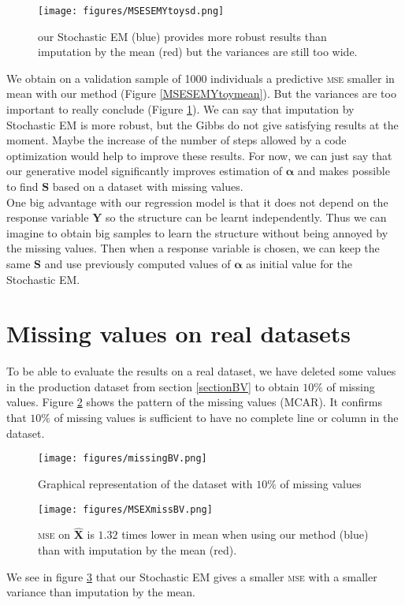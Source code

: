 \documentclass[12pt,a4paper]{report}
\begin{document}
			\begin{figure}[h!]
	\centering
	\texttt{[image: figures/MSESEMYtoysd.png]} 
	\caption{our Stochastic EM (blue) provides more robust results than imputation by the mean (red) but the variances are still too wide.}\label{MSESEMYtoysd}
\end{figure}		
We obtain on a validation sample of 1000 individuals a predictive \textsc{mse} smaller in mean with our method (Figure \ref{MSESEMYtoymean}). But the variances are too important to really conclude (Figure \ref{MSESEMYtoysd}). We can say that imputation by Stochastic EM is more robust, but the Gibbs do not give satisfying results at the moment. Maybe the increase of the number of steps allowed by a code optimization would help to improve these results. For now, we can just say that our generative model significantly improves estimation of $\boldsymbol{\alpha}$ and makes possible to find $\boldsymbol{S}$ based on a dataset with missing values.\\

		One big advantage with our regression model is that it does not depend on the response variable $\boldsymbol{Y}$ so the structure can be learnt independently. Thus we can imagine to obtain big samples to learn the structure without being annoyed by the missing values. Then when a response variable is chosen, we can keep the same $\boldsymbol{S}$ and use previously computed values of $\boldsymbol{\alpha}$ as initial value for the Stochastic EM. 

	\section{Missing values on real datasets}	
		To be able to evaluate the results on a real dataset, we have deleted some values in the production dataset from section \ref{sectionBV} to obtain $10\%$ of missing values. Figure \ref{missingBV} shows the pattern of the missing values (MCAR). It confirms that $10\%$ of missing values is sufficient to have no complete line or column in the dataset. 
	
	\begin{figure}[h!]
		\centering
		\texttt{[image: figures/missingBV.png]} 
		\caption{Graphical representation of the dataset with $10\%$ of missing values}\label{missingBV}
	\end{figure}
	\begin{figure}[h!]
		\centering
		\texttt{[image: figures/MSEXmissBV.png]} 
		\caption{\textsc{mse} on $\hat{\boldsymbol{X}}$ is $1.32$ times lower in mean when using our method (blue) than with imputation by the mean (red).}\label{MSEXmissBV}
	\end{figure}
	We see in figure \ref{MSEXmissBV} that our Stochastic EM gives a smaller \textsc{mse} with a smaller variance than imputation by the mean. 
	
\end{document}
